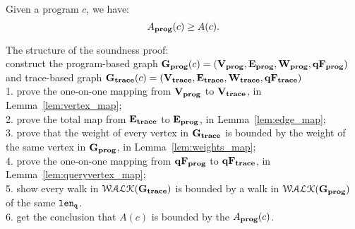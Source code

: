 {
  \begin{thm}
  Given a program ${c}$, we have:
  \[
  A_{\bf{prog}}({c}) \geq A({c}).
  \]
  \end{thm}
}
The structure of the soundness proof:
\\
construct the
program-based graph $\mathtt{\bf{G_{prog}}}({c}) = (\mathtt{\bf{V_{prog}}}, \mathtt{\bf{E_{prog}}}, \mathtt{\bf{W_{prog}}}, \mathtt{\bf{qF_{prog}}})$
\\
and trace-based graph $\mathtt{\bf{G_{trace}}}({c}) = (\mathtt{\bf{V_{trace}}}, \mathtt{\bf{E_{trace}}}, \mathtt{\bf{W_{trace}}}, \mathtt{\bf{qF_{trace}}})$ 
\\
1. prove the one-on-one mapping from $\mathtt{\bf{V_{prog}}}$ to $\mathtt{\bf{V_{trace}}}$, in Lemma~\ref{lem:vertex_map};
\\
2. prove the total map from $\mathtt{\bf{E_{trace}}}$ to $\mathtt{\bf{E_{prog}}}$, in Lemma~\ref{lem:edge_map};
\\
3. prove that the weight of every vertex in $\mathtt{\bf{G_{trace}}}$ is bounded by the weight of the same vertex in $\mathtt{\bf{G_{prog}}}$, in 
Lemma~\ref{lem:weights_map};
\\
4. prove the one-on-one mapping from $\mathtt{\bf{qF_{prog}}}$ to $\mathtt{\bf{qF_{trace}}}$, in Lemma~\ref{lem:queryvertex_map};
\\
5. show every walk in $\mathcal{WALK}(\mathtt{\bf{G_{trace}}})$ is bounded by a walk in $\mathcal{WALK}(\mathtt{\bf{G_{prog}}})$ of the same $\mathtt{len}_{\tt q}$.
\\
6. get the conclusion that $A(c)$ is bounded by 
the $A_{\bf{prog}}(c)$.
%
